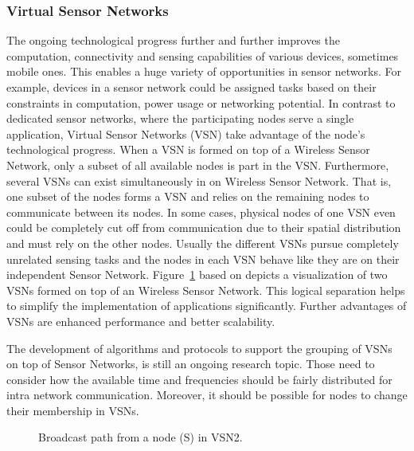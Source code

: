 \documentclass[12pt,journal]{IEEEtran}
\begin{document}
\subsubsection{Virtual Sensor Networks}
The ongoing technological progress further and further improves the computation, connectivity and sensing capabilities of various devices, sometimes mobile ones. \cite{Jayasumana} This enables a huge variety of opportunities in sensor networks. For example, devices in a sensor network could be assigned tasks based on their constraints in computation, power usage or networking potential. In contrast to dedicated sensor networks, where the participating nodes serve a single application, Virtual Sensor Networks (VSN) take advantage of the node’s technological progress. When a VSN is formed on top of a Wireless Sensor Network, only a subset of all available nodes is part in the VSN. Furthermore, several VSNs can exist simultaneously in on Wireless Sensor Network. \cite{Jayasumana} That is, one subset of the nodes forms a VSN and relies on the remaining nodes to communicate between its nodes. In some cases, physical nodes of one VSN even could be completely cut off from communication due to their spatial distribution and must rely on the other nodes. Usually the different VSNs pursue completely unrelated sensing tasks and the nodes in each VSN behave like they are on their independent Sensor Network. Figure~\ref{vsnfig} based on \cite{Jayasumana} depicts a visualization of two VSNs formed on top of an Wireless Sensor Network. This logical separation helps to simplify the implementation of applications significantly. \cite{Jayasumana} Further advantages of VSNs are enhanced performance and better scalability.

The development of algorithms and protocols to support the grouping of VSNs on top of Sensor Networks, is still an ongoing research topic. Those need to consider how the available time and frequencies should be fairly distributed for intra network communication. Moreover, it should be possible for nodes to change their membership in VSNs.

\begin{figure}
 \centering
 \caption{Broadcast path from a node (S) in VSN2.}
 \label{vsnfig}
\end{figure}
\end{document}

